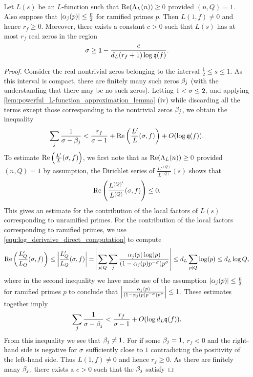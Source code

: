 \documentclass[12pt]{article}
\begin{document}
    \begin{lemma}\label{lem:non-vanshing_at_1_lemma}
      Let \(L(s)\) be an \(L\)-function such that \(\mathrm{Re}(\Lambda_{L}(n)) \ge 0\) provided \((n,Q) = 1\). Also suppose that \(|\alpha_{j}(p)| \le \frac{p}{2}\) for ramified primes \(p\). Then \(L(1,f) \neq 0\) and hence \(r_{f} \ge 0\). Moreover, there exists a constant \(c > 0\) such that \(L(s)\) has at most \(r_{f}\) real zeros in the region
      \[
        \sigma \ge 1-\frac{c}{d_{L}(r_{f}+1)\log{\mathfrak{q}(f)}}.
      \]
    \end{lemma}
    \begin{proof}
      Consider the real nontrivial zeros belonging to the interval \(\frac{1}{2} \le s \le 1\). As this interval is compact, there are finitely many such zeros \(\beta_{j}\) (with the understanding that there may be no such zeros). Letting \(1 < \sigma \le 2\), and applying \cref{lem:powerful_L-function_approximation_lemma} (iv) while discarding all the terms except those corresponding to the nontrivial zeros \(\beta_{j}\), we obtain the inequality
      \[
        \sum_{j}\frac{1}{\sigma-\beta_{j}} < \frac{r_{f}}{\sigma-1}+\mathrm{Re}\left(\frac{L'}{L}(\sigma,f)\right)+O(\log{\mathfrak{q}(f)}).
      \]
      To estimate \(\mathrm{Re}\left(\frac{L'}{L}(\sigma,f)\right)\), we first note that as \(\mathrm{Re}(\Lambda_{L}(n)) \ge 0\) provided \((n,Q) = 1\) by assumption, the Dirichlet series of \(\frac{L'^{(Q)}}{L^{(Q)}}(s)\) shows that
      \[
        \mathrm{Re}\left(\frac{L^{(Q)'}}{L^{(Q)}}(\sigma,f)\right) \le 0.
      \]
      This gives an estimate for the contribution of the local factors of \(L(s)\) corresponding to unramified primes. For the contribution of the local factors corresponding to ramified primes, we use \cref{equ:log_derivaive_direct_computation} to compute
      \[
        \mathrm{Re}\left(\frac{L'_{Q}}{L_{Q}}(\sigma,f)\right) \le \left|\frac{L'_{Q}}{L_{Q}}(\sigma,f)\right| = \left|\sum_{p \mid Q}\sum_{j}\frac{\alpha_{j}(p)\log(p)}{(1-\alpha_{j}(p)p^{-\sigma})p^{\sigma}}\right| \le d_{L}\sum_{p \mid Q}\log(p) \le d_{L}\log{Q},
      \]
      where in the second inequality we have made use of the assumption \(|\alpha_{j}(p)| \le \frac{p}{2}\) for ramified primes \(p\) to conclude that \(\left|\frac{\alpha_{j}(p)}{(1-\alpha_{j}(p)p^{-\sigma})p^{\sigma}}\right| \le 1\). These estimates together imply
      \[
        \sum_{j}\frac{1}{\sigma-\beta_{j}} < \frac{r_{f}}{\sigma-1}+O(\log{d_{L}\mathfrak{q}(f)}).
      \]
      From this inequality we see that \(\beta_{j} \neq 1\). For if some \(\beta_{j} = 1\), \(r_{f} < 0\) and the right-hand side is negative for \(\sigma\) sufficiently close to \(1\) contradicting the positivity of the left-hand side. Thus \(L(1,f) \neq 0\) and hence \(r_{f} \ge 0\). As there are finitely many \(\beta_{j}\), there exists a \(c > 0\) such that the \(\beta_{j}\) satisfy

\end{proof}
\end{document}
